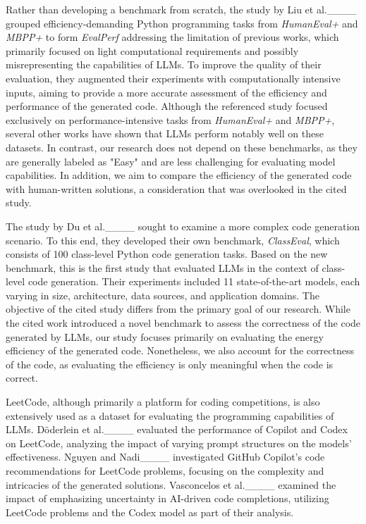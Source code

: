 \par Rather than developing a benchmark from scratch, the study by Liu et al.____ grouped efficiency-demanding Python programming tasks from \textit{HumanEval+} and \textit{MBPP+} to form \textit{EvalPerf} addressing the limitation of previous works, which primarily focused on light computational requirements and possibly misrepresenting the capabilities of LLMs. To improve the quality of their evaluation, they augmented their experiments with computationally intensive inputs, aiming to provide a more accurate assessment of the efficiency and performance of the generated code. Although the referenced study focused exclusively on performance-intensive tasks from \textit{HumanEval+} and \textit{MBPP+}, several other works have shown that LLMs perform notably well on these datasets. In contrast, our research does not depend on these benchmarks, as they are generally labeled as "Easy" and are less challenging for evaluating model capabilities.  In addition, we aim to compare the efficiency of the generated code with human-written solutions, a consideration that was overlooked in the cited study.
\par The study by Du et al.____ sought to examine a more complex code generation scenario. To this end, they developed their own benchmark, \textit{ClassEval}, which consists of 100 class-level Python code generation tasks. Based on the new benchmark, this is the first study that evaluated LLMs in the context of class-level code generation. Their experiments included 11 state-of-the-art models, each varying in size, architecture, data sources, and application domains. The objective of the cited study differs from the primary goal of our research. While the cited work introduced a novel benchmark to assess the correctness of the code generated by LLMs, our study focuses primarily on evaluating the energy efficiency of the generated code. Nonetheless, we also account for the correctness of the code, as evaluating the efficiency is only meaningful when the code is correct.
\par LeetCode, although primarily a platform for coding competitions,  is also extensively used as a dataset for evaluating the programming capabilities of LLMs. Döderlein et al.____ evaluated the performance of Copilot and Codex on LeetCode, analyzing the impact of varying prompt structures on the models' effectiveness. Nguyen and Nadi____ investigated GitHub Copilot's code recommendations for LeetCode problems, focusing on the complexity and intricacies of the generated solutions. Vasconcelos et al.____ examined the impact of emphasizing uncertainty in AI-driven code completions, utilizing LeetCode problems and the Codex model as part of their analysis.

